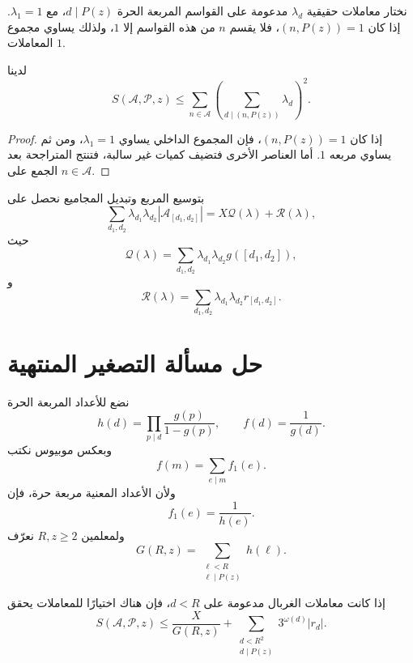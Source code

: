نختار معاملات حقيقية \(\lambda_d\) مدعومة على القواسم المربعة الحرة
\(d\mid P(z)\)، مع \(\lambda_1=1\). إذا كان \((n,P(z))=1\)، فلا يقسم \(n\)
من هذه القواسم إلا \(1\)، ولذلك يساوي مجموع المعاملات \(1\).

\begin{lemma}
\label{lem:chapter15-square-majorant}
\provedhere
لدينا
\[
S(\mathcal A,\mathcal P,z)
\le
\sum_{n\in\mathcal A}
\left(
\sum_{d\mid(n,P(z))}\lambda_d
\right)^2.
\tag{15.1}
\]
\end{lemma}

\begin{proof}
إذا كان \((n,P(z))=1\)، فإن المجموع الداخلي يساوي \(\lambda_1=1\)، ومن ثم
يساوي مربعه \(1\). أما العناصر الأخرى فتضيف كميات غير سالبة، فتنتج المتراجحة
بعد الجمع على \(n\in\mathcal A\).
\end{proof}

بتوسيع المربع وتبديل المجاميع نحصل على
\[
\sum_{d_1,d_2}\lambda_{d_1}\lambda_{d_2}
|\mathcal A_{[d_1,d_2]}|
=
X\mathcal Q(\lambda)+\mathcal R(\lambda),
\tag{15.2}
\]
حيث
\[
\mathcal Q(\lambda)
=
\sum_{d_1,d_2}\lambda_{d_1}\lambda_{d_2}g([d_1,d_2]),
\]
و
\[
\mathcal R(\lambda)
=
\sum_{d_1,d_2}\lambda_{d_1}\lambda_{d_2}r_{[d_1,d_2]}.
\]

\section{حل مسألة التصغير المنتهية}

نضع للأعداد المربعة الحرة
\[
h(d)=\prod_{p\mid d}\frac{g(p)}{1-g(p)},
\qquad
f(d)=\frac1{g(d)}.
\tag{15.3}
\]
وبعكس موبيوس نكتب
\[
f(m)=\sum_{e\mid m}f_1(e).
\]
ولأن الأعداد المعنية مربعة حرة، فإن
\[
f_1(e)=\frac1{h(e)}.
\]
ولمعلمين \(R,z\ge2\) نعرّف
\[
G(R,z)=
\sum_{\substack{\ell<R\\\ell\mid P(z)}}h(\ell).
\tag{15.4}
\]

\begin{theorem}
\label{thm:chapter15-finite-selberg-upper}
\provedhere
إذا كانت معاملات الغربال مدعومة على \(d<R\)، فإن هناك اختيارًا للمعاملات
يحقق
\[
S(\mathcal A,\mathcal P,z)
\le
\frac{X}{G(R,z)}
+
\sum_{\substack{d<R^2\\d\mid P(z)}}3^{\omega(d)}|r_d|.
\tag{15.5}
\]
\end{theorem}

